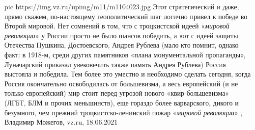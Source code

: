 \ifcmt
  pic https://img.vz.ru/upimg/m11/m1104023.jpg
\fi
Этот стратегический и даже, прямо скажем, по-настоящему геополитический шаг
логично привел к победе во Второй мировой. Нет сомнений в том, что с
троцкистской идеей «\emph{мировой революции}» у России просто не было шансов победить,
а вот с идеей защиты Отечества Пушкина, Достоевского, Андрея Рублева (мало кто
помнит, однако факт: в 1918-м, среди других памятников «плана монументальной
пропаганды», Луначарский приказал увековечить также память Андрея Рублева)
Россия выстояла и победила.  Тем более это уместно и необходимо сделать
сегодня, когда Россия окончательно освободилась от большевизма, а весь
европейский (и не только европейский) мир стоит перед угрозой нового
«квир-большевизма» (ЛГБТ, БЛМ и прочих меньшинств), еще гораздо более
варварского, дикого и безумного, чем прежний троцкистско-ленинский пожар
«\emph{мировой революции}»
, 
Владимир Можегов, vz.ru, 18.06.2021

